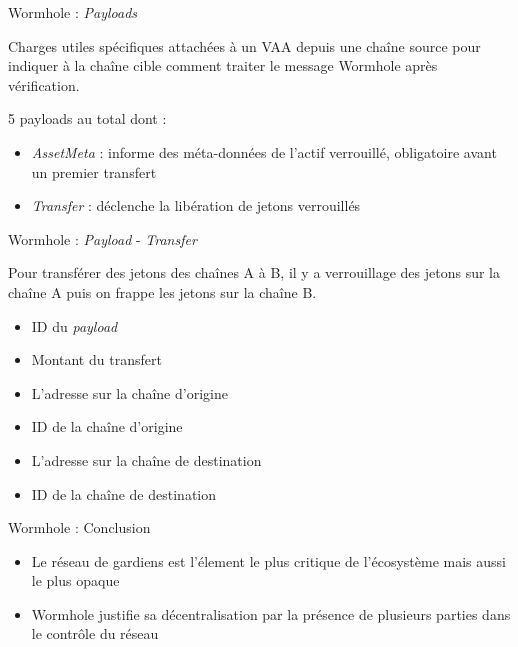 \begin{frame}{Wormhole : \textit{Payloads}}
    
    Charges utiles spécifiques attachées à un VAA depuis une chaîne source pour indiquer à la chaîne cible comment traiter le message Wormhole après vérification.\newline
    
    5 payloads au total dont :
    \begin{itemize}
        \item \textit{AssetMeta} : informe des méta-données de l'actif verrouillé, obligatoire avant un premier transfert
        \item \textit{Transfer} : déclenche la libération de jetons verrouillés
    \end{itemize}
\end{frame}
    
\begin{frame}{Wormhole : \textit{Payload} - \textit{Transfer}}
    
    Pour transférer des jetons des chaînes A à B, il y a verrouillage des jetons sur la chaîne A puis on frappe les jetons sur la chaîne B.\newline
    
    \begin{itemize}
        \item ID du \textit{payload}
        \item Montant du transfert
        \item L'adresse sur la chaîne d'origine 
        \item ID de la chaîne d'origine
        \item L'adresse sur la chaîne de destination
        \item ID de la chaîne de destination
    \end{itemize} 
\end{frame}
    
\begin{frame}{Wormhole : Conclusion}
    
    \begin{itemize}
        \item Le réseau de gardiens est l'élement le plus critique de l'écosystème mais aussi le plus opaque
        \item Wormhole justifie sa décentralisation par la présence de plusieurs parties dans le contrôle du réseau
    \end{itemize}
\end{frame}